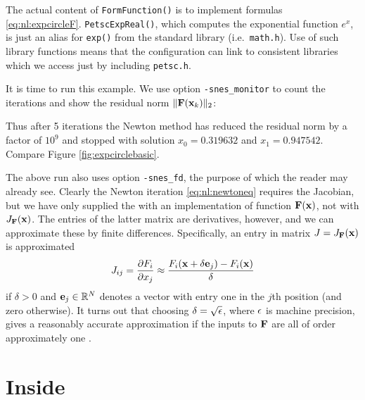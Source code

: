 The actual content of \texttt{FormFunction()} is to implement formulas \eqref{eq:nl:expcircleF}.  \texttt{PetscExpReal()}, which computes the exponential function $e^x$, is just an alias for \texttt{exp()} from the standard library (i.e.~\texttt{math.h}).  Use of such \PETSc library functions means that the \PETSc configuration can link to consistent libraries which we access just by including \texttt{petsc.h}.

It is time to run this example.  We use option \texttt{-snes\_monitor} to count the iterations and show the residual norm $\|\mathbf{F}(\mathbf{x}_k)\|_2$:
Thus after 5 iterations the Newton method has reduced the residual norm by a factor of $10^9$ and stopped with solution $x_0=0.319632$ and $x_1=0.947542$.  Compare Figure \ref{fig:expcirclebasic}.

The above run also uses option \texttt{-snes\_fd}, the purpose of which the reader may already see.  Clearly the Newton iteration \eqref{eq:nl:newtoneq} requires the Jacobian, but we have only supplied the \pSNES with an implementation of function $\mathbf{F}(\mathbf{x})$, not with $J_{\mathbf{F}}(\mathbf{x})$.  The entries of the latter matrix are derivatives, however, and we can approximate these by finite differences.  Specifically, an entry in matrix $J=J_{\mathbf{F}}(\mathbf{x})$ is approximated
\begin{equation}
J_{ij} = \frac{\partial F_i}{\partial x_j} \approx \frac{F_i(\mathbf{x}+\delta \mathbf{e}_j) - F_i(\mathbf{x})}{\delta}  \label{eq:nl:examplefdjac}
\end{equation}
if $\delta>0$ and $\mathbf{e}_j\in \mathbb{R}^N$ denotes a vector with entry one in the $j$th position (and zero otherwise).  It turns out that choosing $\delta = \sqrt{\epsilon}$, where $\epsilon$ is machine precision, gives a reasonably accurate approximation if the inputs to $\mathbf{F}$ are all of order approximately one \citep{Kelley2003}.


\section{Inside \pSNES} \label{sec:insidesnes}

